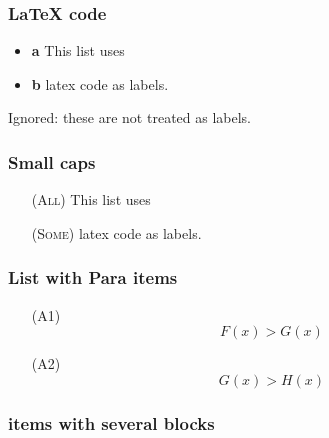\hypertarget{latex-code}{%
\subsubsection{LaTeX code}\label{latex-code}}

\begin{itemize}
\tightlist
\item
  {\textbf{a}} This list uses
\item
  {\textbf{b}} latex code as labels.
\end{itemize}

Ignored: these are not treated as labels.

\hypertarget{small-caps}{%
\subsubsection{Small caps}\label{small-caps}}

\begin{itemize}
\tightlist

\item[(\textsc{All})] This list uses

\item[(\textsc{Some})] latex code as labels.

\end{itemize}

\hypertarget{list-with-para-items}{%
\subsubsection{List with Para items}\label{list-with-para-items}}

\begin{itemize}
\tightlist

\item[(A1)] \[F(x) > G(x)\]

\item[(A2)] \[G(x) > H(x)\]

\end{itemize}

\hypertarget{items-with-several-blocks}{%
\subsubsection{items with several
blocks}\label{items-with-several-blocks}}

